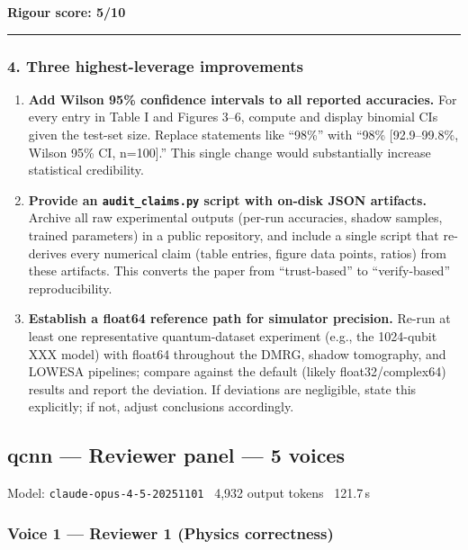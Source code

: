 \documentclass[10pt,letterpaper]{article}
\begin{document}
\textbf{Rigour score: 5/10}

\begin{center}\rule{0.5\linewidth}{0.5pt}\end{center}

\hypertarget{three-highest-leverage-improvements}{%
\subsubsection{4. Three highest-leverage improvements}\label{three-highest-leverage-improvements}}

\begin{enumerate}
\def\labelenumi{\arabic{enumi}.}
\item
  \textbf{Add Wilson 95\% confidence intervals to all reported accuracies.} For every entry in Table I and Figures 3--6, compute and display binomial CIs given the test-set size. Replace statements like ``98\%'' with ``98\% {[}92.9--99.8\%, Wilson 95\% CI, n=100{]}.'' This single change would substantially increase statistical credibility.
\item
  \textbf{Provide an \texttt{audit\_claims.py} script with on-disk JSON artifacts.} Archive all raw experimental outputs (per-run accuracies, shadow samples, trained parameters) in a public repository, and include a single script that re-derives every numerical claim (table entries, figure data points, ratios) from these artifacts. This converts the paper from ``trust-based'' to ``verify-based'' reproducibility.
\item
  \textbf{Establish a float64 reference path for simulator precision.} Re-run at least one representative quantum-dataset experiment (e.g., the 1024-qubit XXX model) with float64 throughout the DMRG, shadow tomography, and LOWESA pipelines; compare against the default (likely float32/complex64) results and report the deviation. If deviations are negligible, state this explicitly; if not, adjust conclusions accordingly.
\end{enumerate}


\subsection{qcnn --- Reviewer panel — 5 voices}
\noindent\textcolor{muted}{\small Model: \texttt{claude-opus-4-5-20251101} \textperiodcentered\ 4,932 output tokens \textperiodcentered\ 121.7\,s}

\hypertarget{voice-1-reviewer-1-physics-correctness}{%
\subsubsection{Voice 1 --- Reviewer 1 (Physics correctness)}\label{voice-1-reviewer-1-physics-correctness}}
\end{document}
